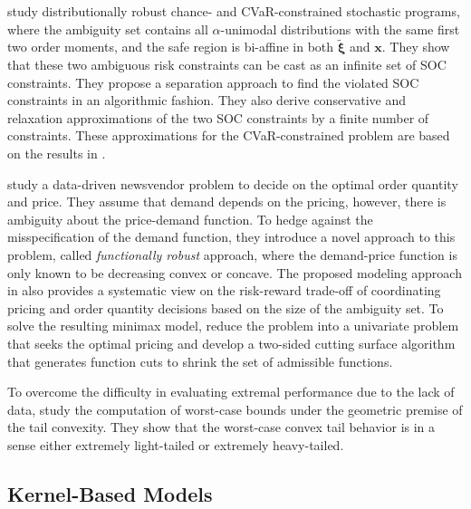 \documentclass[final,onefignum,onetabnum]{class}
\newcommand{\bs}[1]{\boldsymbol{#1}} %
\newcommand{\txi}{\tilde{\bs{\xi}}}
\begin{document}
\citet{li2017} study distributionally robust chance- and CVaR-constrained stochastic programs, where  the ambiguity set contains all $\alpha$-unimodal distributions with the same first two order moments,  and the safe region is bi-affine in both $\txi$ and $\bs{x}$. They show that these two ambiguous risk constraints can be cast as an infinite set of SOC constraints. They  propose a separation approach   to find the violated  SOC  constraints in an algorithmic fashion. They also derive    conservative and relaxation approximations of the two SOC constraints by a finite number of constraints. These approximations for the CVaR-constrained problem are based on  the results in \citet{vanparys2017structured}. 

\citet{hu2015} study a data-driven newsvendor problem to decide on the optimal order quantity and price. They assume that demand depends on the pricing, however, there is ambiguity about the price-demand function. To hedge against the misspecification of the demand function, they introduce a novel approach to  this problem, called  {\it functionally robust} approach, where   the demand-price function is only known to be decreasing convex or concave. The proposed modeling approach in \citet{hu2018}  also  provides a systematic view on the risk-reward trade-off of coordinating pricing and order quantity decisions based on the size of the ambiguity set. To solve the resulting minimax model, \citet{hu2018}  reduce the problem into a univariate problem that seeks the optimal pricing and develop a two-sided cutting surface algorithm that generates function cuts to shrink the set of  admissible functions. 

To overcome the difficulty in evaluating extremal performance due to the lack of data, \citet{lam2017tail} study the computation of worst-case bounds under the geometric premise of the tail convexity. They show that 
the worst-case convex tail behavior is in a sense either extremely light-tailed or extremely
heavy-tailed. 


\subsection{Kernel-Based Models}
\label{sec: rev.kernel}
\end{document}

